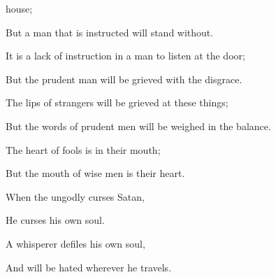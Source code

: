 {{} house;
\par }{\Q But a man that is instructed will stand without.
\par }{\Q {}It is a lack of instruction in a man to listen at the door;
\par }{\Q But the prudent man will be grieved with the disgrace.
\par }{\Q {} The lips of strangers will be grieved at these things;
\par }{\Q But the words of prudent men will be weighed in the balance.
\par }{\BB \par }{\Q {}The heart of fools is in their mouth;
\par }{\Q But the mouth of wise men is their heart.
\par }{\Q {}When the ungodly curses Satan,
\par }{\Q He curses his own soul.
\par }{\Q {}A whisperer defiles his own soul,
\par }{\Q And will be hated wherever he travels.
\par }{\BB \par }
